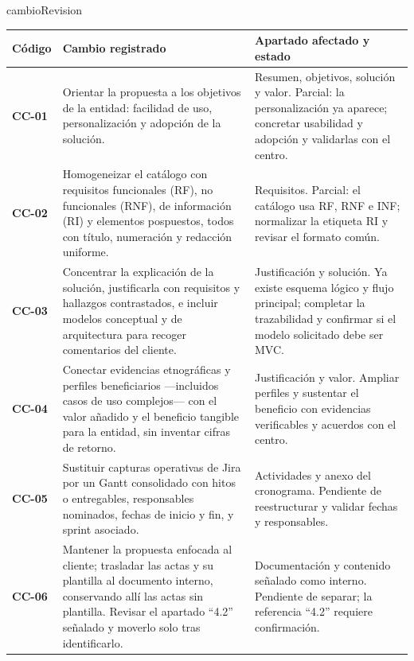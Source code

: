 \begin{cambiocontenido}{cambioRevision}
\begingroup
\small
\renewcommand{\arraystretch}{1.12}
\setlength{\tabcolsep}{4pt}
\noindent\begin{tabularx}{\textwidth}{|>{\centering\arraybackslash}p{1.25cm}|>{\raggedright\arraybackslash}p{7.3cm}|>{\raggedright\arraybackslash}X|}
\hline
\rowcolor{tableHeader}
Código & Cambio registrado & Apartado afectado y estado \\
\hline
\textcolor[HTML]{AD0090}{\textbf{CC-01}} & \textcolor[HTML]{AD0090}{Orientar la propuesta a los objetivos de la entidad: facilidad de uso, personalización y adopción de la solución.} & \textcolor[HTML]{AD0090}{Resumen, objetivos, solución y valor. Parcial: la personalización ya aparece; concretar usabilidad y adopción y validarlas con el centro.} \\
\hline
\textcolor[HTML]{005D75}{\textbf{CC-02}} & \textcolor[HTML]{005D75}{Homogeneizar el catálogo con requisitos funcionales (RF), no funcionales (RNF), de información (RI) y elementos pospuestos, todos con título, numeración y redacción uniforme.} & \textcolor[HTML]{005D75}{Requisitos. Parcial: el catálogo usa RF, RNF e INF; normalizar la etiqueta RI y revisar el formato común.} \\
\hline
\textcolor[HTML]{275DAD}{\textbf{CC-03}} & \textcolor[HTML]{275DAD}{Concentrar la explicación de la solución, justificarla con requisitos y hallazgos contrastados, e incluir modelos conceptual y de arquitectura para recoger comentarios del cliente.} & \textcolor[HTML]{275DAD}{Justificación y solución. Ya existe esquema lógico y flujo principal; completar la trazabilidad y confirmar si el modelo solicitado debe ser MVC.} \\
\hline
\textcolor[HTML]{287A4B}{\textbf{CC-04}} & \textcolor[HTML]{287A4B}{Conectar evidencias etnográficas y perfiles beneficiarios —incluidos casos de uso complejos— con el valor añadido y el beneficio tangible para la entidad, sin inventar cifras de retorno.} & \textcolor[HTML]{287A4B}{Justificación y valor. Ampliar perfiles y sustentar el beneficio con evidencias verificables y acuerdos con el centro.} \\
\hline
\textcolor[HTML]{A65300}{\textbf{CC-05}} & \textcolor[HTML]{A65300}{Sustituir capturas operativas de Jira por un Gantt consolidado con hitos o entregables, responsables nominados, fechas de inicio y fin, y sprint asociado.} & \textcolor[HTML]{A65300}{Actividades y anexo del cronograma. Pendiente de reestructurar y validar fechas y responsables.} \\
\hline
\textcolor[HTML]{9C365D}{\textbf{CC-06}} & \textcolor[HTML]{9C365D}{Mantener la propuesta enfocada al cliente; trasladar las actas y su plantilla al documento interno, conservando allí las actas sin plantilla. Revisar el apartado “4.2” señalado y moverlo solo tras identificarlo.} & \textcolor[HTML]{9C365D}{Documentación y contenido señalado como interno. Pendiente de separar; la referencia “4.2” requiere confirmación.} \\

\end{tabularx}
\end{cambiocontenido}
